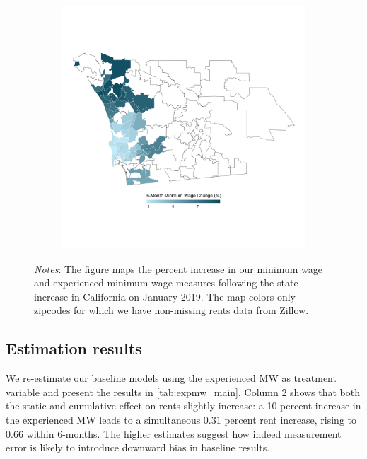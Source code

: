 \begin{figure}
\begin{subfigure}[b]{0.55\textwidth}
		\includegraphics[width = \textwidth]
		{../../analysis/descriptive_maps/output/San_Diego_expmw_msa.png}
	\end{subfigure}
	\begin{minipage}{0.95\textwidth} \footnotesize
		\vspace{2mm} 
		\textit{Notes}: The figure maps the percent increase in our minimum wage and 
		experienced minimum wage measures following the state increase in California
		on January 2019. The map colors only zipcodes for which we have non-missing 
		rents data from Zillow.
	\end{minipage}
\end{figure}


\subsection{Estimation results}

We re-estimate our baseline models using the experienced MW as treatment variable and present 
the results in \autoref{tab:expmw_main}. Column 2 shows that both the static and cumulative 
effect on rents slightly increase: a 10 percent increase in the experienced MW leads to a simultaneous
$0.31$ percent rent increase, rising to $0.66$ within 6-months. The higher estimates suggest how 
indeed measurement error is likely to introduce downward bias in baseline results.


